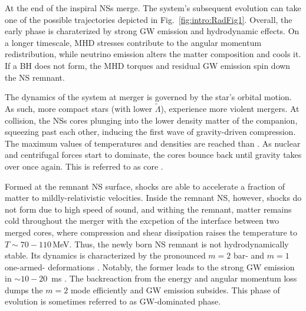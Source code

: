 At the end of the inspiral \acp{NS} merge. 
The system's subsequent evolution can take one of the possible trajectories 
depicted in Fig.~\ref{fig:intro:RadFig1}. Overall, the early \pmerg{} phase is 
charaterized by strong \ac{GW} emission and hydrodynamic effects. 
On a longer timescale, \ac{MHD} stresses contribute to the angular momentum redistribution, 
while neutrino emission alters the matter composition and cools it.
%
If a \ac{BH} does not form, the \ac{MHD} torques and residual \ac{GW} 
emission spin down the \ac{NS} remnant. 


The dynamics of the system at merger is governed by the star's orbital motion. As such, 
more compact stars (with lower $\tilde{\Lambda}$), experience more violent mergers. 
%
At collision, the \acp{NS} cores plunging into the lower density matter of the companion, 
squeezing past each other, inducing the first wave of gravity-driven compression. 
The maximum values of temperatures and densities are reached than \citep{Perego:2019adq}. 
As nuclear and centrifugal forces start to dominate, the cores bounce back until gravity 
takes over once again. This is referred to as core \bnc{} \citep[\eg][]{Radice:2018pdn}. 
%

Formed at the remnant \ac{NS} surface, shocks are able to accelerate a fraction of matter 
to mildly-relativistic velocities. 
Inside the remnant \ac{NS}, however, shocks do not form due to high speed of sound, 
and withing the remnant, matter remains cold throughout the merger with 
the excpetion of the interface between 
two merged cores, where compression and shear dissipation raises the temperature 
to $T\sim70-110\,$MeV.
%
Thus, the newly born \ac{NS} remnant is not hydrodynamically stable. 
Its dynamics is characterized by the pronounced $m=2$ bar- and $m=1$ one-armed-
deformations \citep[\eg][]{Radice:2016gym}.
%
Notably, the former leads to the strong \ac{GW} emission 
in ${\sim}10-20$~ms \pmerg{}. The backreaction from the energy and angular momentum 
loss dumps the $m=2$ mode efficiently and \ac{GW} emission subsides. 
%
This phase of evolution is sometimes referred to as \ac{GW}-dominated \pmerg{} phase.


